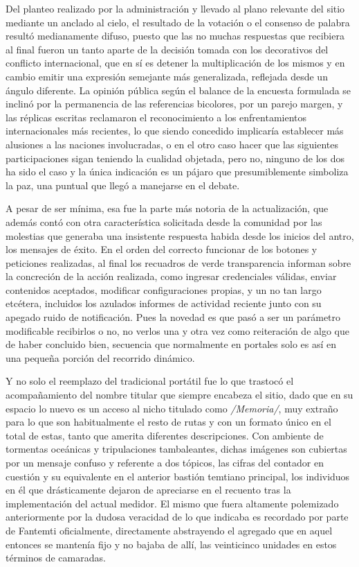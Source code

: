 \documentclass[
]{book}
\begin{document}
Del planteo realizado por la administración y llevado al plano relevante del sitio mediante un anclado al cielo, el resultado de la votación o el consenso de palabra resultó medianamente difuso, puesto que las no muchas respuestas que recibiera al final fueron un tanto aparte de la decisión tomada con los decorativos del conflicto internacional, que en sí es detener la multiplicación de los mismos y en cambio emitir una expresión semejante más generalizada, reflejada desde un ángulo diferente. La opinión pública según el balance de la encuesta formulada se inclinó por la permanencia de las referencias bicolores, por un parejo margen, y las réplicas escritas reclamaron el reconocimiento a los enfrentamientos internacionales más recientes, lo que siendo concedido implicaría establecer más alusiones a las naciones involucradas, o en el otro caso hacer que las siguientes participaciones sigan teniendo la cualidad objetada, pero no, ninguno de los dos ha sido el caso y la única indicación es un pájaro que presumiblemente simboliza la paz, una puntual que llegó a manejarse en el debate.

A pesar de ser mínima, esa fue la parte más notoria de la actualización, que además contó con otra característica solicitada desde la comunidad por las molestias que generaba una insistente respuesta habida desde los inicios del antro, los mensajes de éxito. En el orden del correcto funcionar de los botones y peticiones realizadas, al final los recuadros de verde transparencia informan sobre la concreción de la acción realizada, como ingresar credenciales válidas, enviar contenidos aceptados, modificar configuraciones propias, y un no tan largo etcétera, incluidos los azulados informes de actividad reciente junto con su apegado ruido de notificación. Pues la novedad es que pasó a ser un parámetro modificable recibirlos o no, no verlos una y otra vez como reiteración de algo que de haber concluido bien, secuencia que normalmente en portales solo es así en una pequeña porción del recorrido dinámico.

Y no solo el reemplazo del tradicional portátil fue lo que trastocó el acompañamiento del nombre titular que siempre encabeza el sitio, dado que en su espacio lo nuevo es un acceso al nicho titulado como \emph{/Memoria/}, muy extraño para lo que son habitualmente el resto de rutas y con un formato único en el total de estas, tanto que amerita diferentes descripciones. Con ambiente de tormentas oceánicas y tripulaciones tambaleantes, dichas imágenes son cubiertas por un mensaje confuso y referente a dos tópicos, las cifras del contador en cuestión y su equivalente en el anterior bastión temtiano principal, los individuos en él que drásticamente dejaron de apreciarse en el recuento tras la implementación del actual medidor. El mismo que fuera altamente polemizado anteriormente por la dudosa veracidad de lo que indicaba es recordado por parte de Fantemti oficialmente, directamente abstrayendo el agregado que en aquel entonces se mantenía fijo y no bajaba de allí, las veinticinco unidades en estos términos de camaradas.
\end{document}

